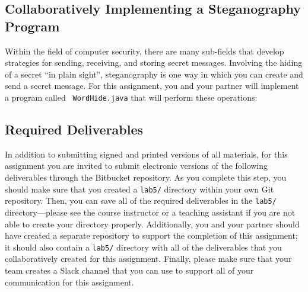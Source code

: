 \vspace{-0.1in}
\subsection*{Collaboratively Implementing a Steganography Program}
\vspace{-0.05in}

Within the field of computer security, there are many sub-fields that develop strategies for sending, receiving, and
storing secret messages.  Involving the hiding of a secret ``in plain sight'', steganography is one way in which you can
create and send a secret message. For this assignment, you and your partner will implement a program called {\tt
WordHide.java} that will perform these operations:

\vspace*{-.1in}
\subsection*{Required Deliverables}

In addition to submitting signed and printed versions of all materials, for this assignment you are invited to submit
electronic versions of the following deliverables through the Bitbucket repository. As you complete this step, you
should make sure that you created a {\tt lab5/} directory within your own Git repository.  Then, you can save all of the
required deliverables in the {\tt lab5/} directory---please see the course instructor or a teaching assistant if you are
not able to create your directory properly. Additionally, you and your partner should have created a separate repository
to support the completion of this assignment; it should also contain a {\tt lab5/} directory with all of the
deliverables that you collaboratively created for this assignment. Finally, please make sure that your team creates a
Slack channel that you can use to support all of your communication for this assignment.

